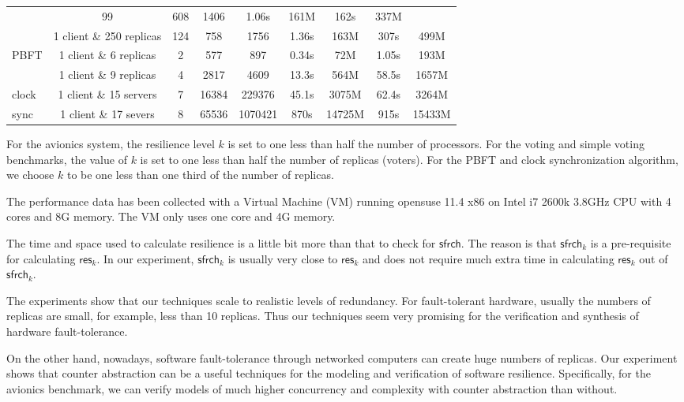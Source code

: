 \documentclass[times,10pt,twocolumn]{article}
\newcommand\res{\mathsf{res}}
\newcommand\safe{\mathsf{sfrch}}
\begin{document}
\begin{table*}[t]
\begin{center}
\begin{tabular}{l|c|c|c|c||c|c||c|c}
	 & 99 & 608 & 1406 & 1.06s & 161M & 162s & 337M \\ \cline{2-9} 
	 & 1 client \& 250 replicas 
	 & 124 & 758 & 1756 & 1.36s & 163M & 307s & 499M \\ \hline 
PBFT 	 & 1 client \& 6 replicas 
	 & 2 & 577 & 897 & 0.34s & 72M & 1.05s & 193M \\ \cline{2-9} 
	 & 1 client \& 9 replicas 
	 & 4 & 2817 & 4609 & 13.3s & 564M & 58.5s & 1657M \\ \hline 
clock	 & 1 client \& 15 servers  
	 & 7 & 16384 & 229376 & 45.1s & 3075M & 62.4s & 3264M  \\ \cline{2-9} 
sync	 & 1 client \& 17 severs  
	 & 8 & 65536 & 1070421 & 870s & 14725M & 915s & 15433M  \\ \hline 
\end{tabular}
\end{center}
\vspace*{-5mm}
\end{table*}
For the avionics system, %
the resilience level $k$ is set to 
one less than half the %
number of processors.  
For the voting and simple voting benchmarks, 
the value of $k$ is set to one less than half the number of 
replicas (voters). 
For the PBFT and clock synchronization algorithm, we choose 
$k$ to be one less than one third of the number of replicas. 

The performance data has been collected with a Virtual Machine (VM) 
running opensuse 11.4 x86 
on Intel i7 2600k 3.8GHz CPU 
with 4 cores and 8G memory. 
The VM only uses one core and 4G memory.  

The time and space used to calculate resilience is a little bit more 
than that to check for $\safe$.  
The reason is that $\safe_k$ is a pre-requisite for calculating $\res_k$.  
In our experiment, $\safe_k$ is usually 
very close to $\res_k$ and does not require much extra time in 
calculating $\res_k$ out of $\safe_k$.  

The experiments show that our techniques 
scale to realistic levels of redundancy.  
For fault-tolerant hardware, usually the numbers of replicas are small, 
for example, less than 10 replicas. 
Thus our techniques seem very promising for the 
verification and synthesis\label{reply2.verification.hardware} of hardware fault-tolerance.  

On the other hand, 
nowadays, software fault-tolerance through networked computers can 
create huge numbers of replicas.  
Our experiment shows that counter abstraction can be a useful 
techniques for the modeling and verification of software resilience.  
Specifically, for the avionics benchmark, 
we can verify models of much higher concurrency and complexity with 
counter abstraction than without. 
\end{document}
